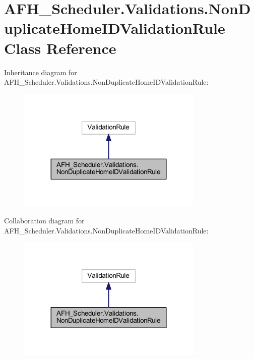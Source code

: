 \section{A\+F\+H\+\_\+\+Scheduler.\+Validations.\+Non\+Duplicate\+Home\+I\+D\+Validation\+Rule Class Reference}
\label{class_a_f_h___scheduler_1_1_validations_1_1_non_duplicate_home_i_d_validation_rule}


Inheritance diagram for A\+F\+H\+\_\+\+Scheduler.\+Validations.\+Non\+Duplicate\+Home\+I\+D\+Validation\+Rule\+:
\nopagebreak
\begin{figure}[H]
\begin{center}
\leavevmode
\includegraphics[width=251pt]{class_a_f_h___scheduler_1_1_validations_1_1_non_duplicate_home_i_d_validation_rule__inherit__graph}
\end{center}
\end{figure}


Collaboration diagram for A\+F\+H\+\_\+\+Scheduler.\+Validations.\+Non\+Duplicate\+Home\+I\+D\+Validation\+Rule\+:
\nopagebreak
\begin{figure}[H]
\begin{center}
\leavevmode
\includegraphics[width=251pt]{class_a_f_h___scheduler_1_1_validations_1_1_non_duplicate_home_i_d_validation_rule__coll__graph}
\end{center}
\end{figure}

